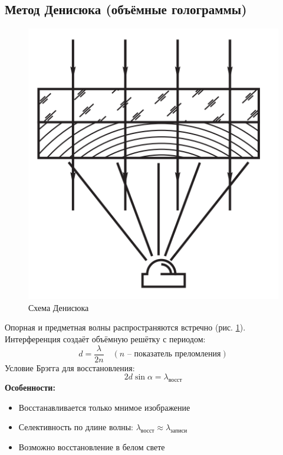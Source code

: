 \documentclass[aps,twocolumn,secnumarabic,balancelastpage,amsmath,amssymb,nofootinbib, floatfix]{revtex4-1}
\begin{document}
\subsection{Метод Денисюка (объёмные голограммы)}
\begin{figure}[H]
	\centering
	\includegraphics[width=\columnwidth]{images/den.png}
	\caption{Схема Денисюка}
	\label{fig:denisyuk}
\end{figure}
Опорная и предметная волны распространяются встречно (рис. \ref{fig:denisyuk}). Интерференция создаёт объёмную решётку с периодом:
\begin{equation}
	d = \frac{\lambda}{2n} \quad (n\text{ -- показатель преломления})
\end{equation}
Условие Брэгга для восстановления:
\begin{equation}
	2d \sin\alpha = \lambda_{\text{восст}}
\end{equation}
\textbf{Особенности:}
\begin{itemize}
	\item Восстанавливается только мнимое изображение
	\item Селективность по длине волны: $\lambda_{\text{восст}} \approx \lambda_{\text{записи}}$
	\item Возможно восстановление в белом свете
\end{itemize}
\end{document}
